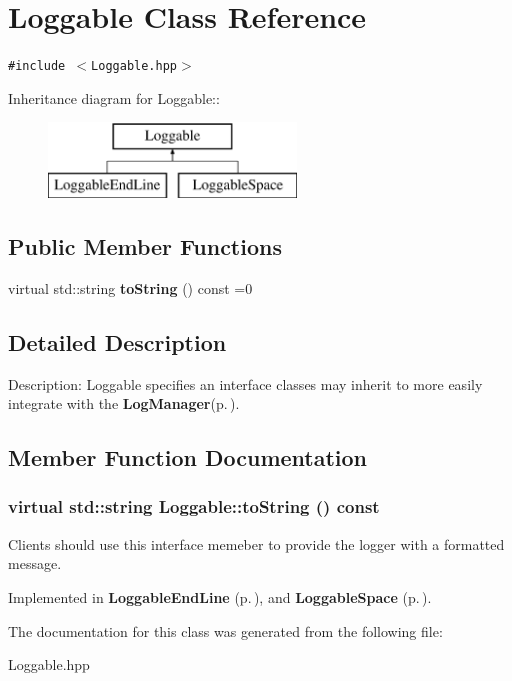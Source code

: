 \section{Loggable Class Reference}
\label{classLoggable}
{\tt \#include $<$Loggable.hpp$>$}

Inheritance diagram for Loggable::\begin{figure}[H]
\begin{center}
\leavevmode
\includegraphics[height=2cm]{classLoggable}
\end{center}
\end{figure}
\subsection*{Public Member Functions}
\begin{CompactItemize}
\item 
virtual std::string {\bf to\-String} () const =0
\end{CompactItemize}


\subsection{Detailed Description}
Description: Loggable specifies an interface classes may inherit to more easily integrate with the {\bf Log\-Manager}{\rm (p.\,\pageref{classLogManager})}.



\subsection{Member Function Documentation}
\subsubsection{\setlength{\rightskip}{0pt plus 5cm}virtual std::string Loggable::to\-String () const\hspace{0.3cm}{\tt  [pure virtual]}}\label{classLoggable_a0}


Clients should use this interface memeber to provide the logger with a formatted message.

Implemented in {\bf Loggable\-End\-Line} {\rm (p.\,\pageref{classLoggableEndLine_a0})}, and {\bf Loggable\-Space} {\rm (p.\,\pageref{classLoggableSpace_a0})}.

The documentation for this class was generated from the following file:\begin{CompactItemize}
\item 
Loggable.hpp\end{CompactItemize}
